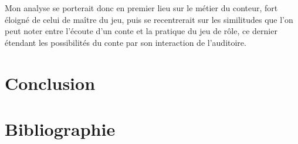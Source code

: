 \documentclass[a4paper,12pt,final,oneside]{article}
\begin{document}
Mon analyse se porterait donc en premier lieu sur le métier du conteur, fort éloigné de celui de maître du jeu, puis se recentrerait sur les similitudes que l'on peut noter entre l'écoute d'un conte et la pratique du jeu de rôle, ce dernier étendant les possibilités du conte par son interaction de l'auditoire.

\clearpage


\section{Conclusion}
\clearpage

\section{Bibliographie}
\def\section*#1{} %


\end{document}

